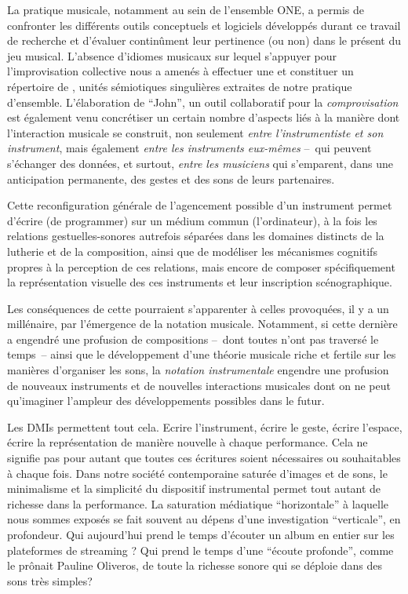 \noindent La pratique musicale, notamment au sein de l'ensemble ONE, a permis de confronter les différents outils conceptuels et logiciels développés durant ce travail de recherche et d'évaluer continûment leur pertinence (ou non) dans le présent du jeu musical. L'absence d'idiomes musicaux sur lequel s'appuyer pour l'improvisation collective nous a amenés à effectuer une  et constituer un répertoire de , unités sémiotiques singulières extraites de notre pratique d'ensemble. L'élaboration de ``John'', un outil collaboratif pour la \textit{comprovisation} est également venu concrétiser un certain nombre d'aspects liés à la manière dont l'interaction musicale se construit, non seulement \textit{entre l'instrumentiste et son instrument}, mais également \textit{entre les instruments eux-mêmes} --~qui peuvent s'échanger des données, et surtout, \textit{entre les musiciens} qui s'emparent, dans une anticipation permanente, des gestes et des sons de leurs partenaires.


\noindent Cette reconfiguration générale de l'agencement possible d'un instrument permet d'écrire (de programmer) sur un médium commun (l'ordinateur), à la fois les relations gestuelles-sonores autrefois séparées dans les domaines distincts de la lutherie et de la composition, ainsi que de modéliser les mécanismes cognitifs propres à la perception de ces relations, mais encore de composer spécifiquement la représentation visuelle des ces instruments et leur inscription scénographique. 


Les conséquences de cette  pourraient s'apparenter à celles provoquées, il y a un millénaire, par l'émergence de la notation musicale. Notamment, si cette dernière a engendré une profusion de compositions --~dont toutes n'ont pas traversé le temps~-- ainsi que le développement d'une théorie musicale riche et fertile sur les manières d'organiser les sons, la \textit{notation instrumentale} engendre une profusion de nouveaux instruments et de nouvelles interactions musicales dont on ne peut qu'imaginer l'ampleur des développements possibles dans le futur.


Les \glspl{DMI} permettent tout cela. Ecrire l'instrument, écrire le geste, écrire l'espace, écrire la représentation de manière nouvelle à chaque performance. Cela ne signifie pas pour autant que toutes ces écritures soient nécessaires ou souhaitables à chaque fois. Dans notre société contemporaine saturée d'images et de sons, le minimalisme et la simplicité du dispositif instrumental permet tout autant de richesse dans la performance. La saturation médiatique ``horizontale'' à laquelle nous sommes exposés se fait souvent au dépens d'une investigation ``verticale'', en profondeur. Qui aujourd'hui prend le temps d'écouter un album en entier sur les plateformes de streaming ? Qui prend le temps d'une ``écoute profonde'', comme le prônait Pauline Oliveros, de toute la richesse sonore qui se déploie dans des sons très simples?

